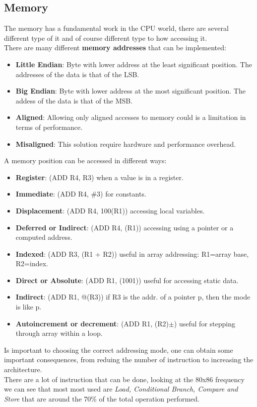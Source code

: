 \documentclass[12pt]{article}
\begin{document}
\subsection{Memory}
The memory has a fundamental work in the CPU world, there are several different type of it and of course different type to how accessing it.\\
There are many different \textbf{memory addresses} that can be implemented:
\begin{itemize}
  \item \textbf{Little Endian}: Byte with lower address at the least significant position. The addresses of the data is that of the LSB.
  \item \textbf{Big Endian}: Byte with lower address at the most significant position. The addess of the data is that of the MSB.
  \item \textbf{Aligned}: Allowing only aligned accesses to memory could is a limitation in terms of performance.
  \item \textbf{Misaligned}: This solution require hardware and performance overhead.
\end{itemize}
A memory position can be accessed in different ways:
\begin{itemize}
  \item \textbf{Register}: (ADD R4, R3) when a value is in a register.
  \item \textbf{Immediate}: (ADD R4, \#3) for constants.
  \item \textbf{Displacement}: (ADD R4, 100(R1)) accessing local variables.
  \item \textbf{Deferred or Indirect}: (ADD R4, (R1)) accessing using a pointer or a computed address.
  \item \textbf{Indexed}: (ADD R3, (R1 + R2)) useful in array addressing: R1=array base, R2=index.
  \item \textbf{Direct or Absolute}: (ADD R1, (1001)) useful for accessing static data.
  \item \textbf{Indirect}: (ADD R1, @(R3)) if R3 is the addr. of a pointer p, then the mode is like \*p.
  \item \textbf{Autoincrement or decrement}: (ADD R1, (R2)$\pm$) useful for stepping through array within a loop.
\end{itemize}
Is important to choosing the correct addressing mode, one can obtain some important consequences, from reduing the number of instruction to increasing the architecture.\\
There are a lot of instruction that can be done, looking at the 80x86 frequency we can see that most most used are \textit{Load, Conditional Branch, Compare and Store} that are around the 70\% of the total operation performed.\\
\end{document}
